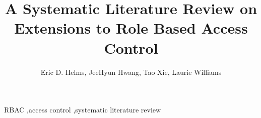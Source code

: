 \documentclass[3p,12pt]{elsarticle}
\begin{document}
\begin{frontmatter}

\title{A Systematic Literature Review on Extensions to Role Based Access Control}
	
\author{Eric D. Helms, JeeHyun Hwang, Tao Xie, Laurie Williams}
\address{North Carolina State University}
\address{Department of Computer Science}
\address{890 Oval Drive, Box 8206}
\address{Raleigh, NC 27695-2858}




\begin{keyword}
RBAC \sep access control \sep systematic literature review
\end{keyword}

\end{frontmatter}




		









\end{document}
